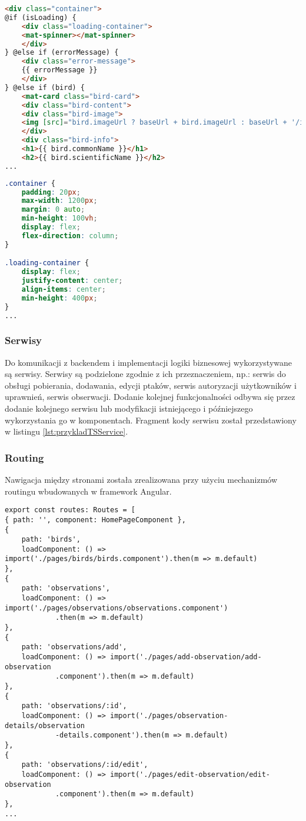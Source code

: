 \begin{lstlisting}[language=HTML, caption={Fragment szablonu html komponentu}]
<div class="container">
@if (isLoading) {
	<div class="loading-container">
	<mat-spinner></mat-spinner>
	</div>
} @else if (errorMessage) {
	<div class="error-message">
	{{ errorMessage }}
	</div>
} @else if (bird) {
	<mat-card class="bird-card">
	<div class="bird-content">
	<div class="bird-image">
	<img [src]="bird.imageUrl ? baseUrl + bird.imageUrl : baseUrl + '/images/placeholder.jpg'" [alt]="bird.commonName">
	</div>
	<div class="bird-info">
	<h1>{{ bird.commonName }}</h1>
	<h2>{{ bird.scientificName }}</h2>
...
\end{lstlisting}

\begin{lstlisting}[language=CSS, caption={Fragment styli css komponentu}]
.container {
	padding: 20px;
	max-width: 1200px;
	margin: 0 auto;
	min-height: 100vh;
	display: flex;
	flex-direction: column;
}

.loading-container {
	display: flex;
	justify-content: center;
	align-items: center;
	min-height: 400px;
}
...
\end{lstlisting}

\subsubsection{Serwisy}
Do komunikacji z backendem i implementacji logiki biznesowej wykorzystywane są serwisy. Serwisy są podzielone zgodnie z ich przeznaczeniem, np.: serwis do obsługi pobierania, dodawania, edycji ptaków, serwis autoryzacji użytkowników i uprawnień, serwis obserwacji.
Dodanie kolejnej funkcjonalności odbywa się przez dodanie kolejnego serwisu lub modyfikacji istniejącego i późniejszego wykorzystania go w komponentach. Fragment kody serwisu został przedstawiony w listingu \ref{lst:przykladTSService}.

\subsubsection{Routing}
Nawigacja między stronami została zrealizowana przy użyciu mechanizmów routingu wbudowanych w framework Angular.
\begin{lstlisting}[style=tsstyle, caption={Fragment kodu routingu}]
export const routes: Routes = [
{ path: '', component: HomePageComponent },
{
	path: 'birds',
	loadComponent: () => import('./pages/birds/birds.component').then(m => m.default)
},
{
	path: 'observations',
	loadComponent: () => import('./pages/observations/observations.component')
			.then(m => m.default)
},
{
	path: 'observations/add',
	loadComponent: () => import('./pages/add-observation/add-observation
			.component').then(m => m.default)
},
{
	path: 'observations/:id',
	loadComponent: () => import('./pages/observation-details/observation
			-details.component').then(m => m.default)
},
{
	path: 'observations/:id/edit',
	loadComponent: () => import('./pages/edit-observation/edit-observation
			.component').then(m => m.default)
},
...
\end{lstlisting}

